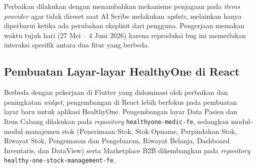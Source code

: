 \begin{enumerate}
          Perbaikan dilakukan dengan menambahkan mekanisme penjagaan pada \textit{items
              provider} agar tidak direset saat AI Scribe melakukan \textit{update},
          melainkan hanya diperbarui ketika ada perubahan eksplisit dari pengguna.
          Pengerjaan memakan waktu tujuh hari (27 Mei -- 4 Juni 2026) karena reproduksi
          bug ini memerlukan interaksi spesifik antara dua fitur yang berbeda.

\end{enumerate}

\subsection{Pembuatan Layar-layar HealthyOne di React}
Berbeda dengan pekerjaan di Flutter yang didominasi oleh perbaikan dan
peningkatan \textit{widget}, pengembangan di React lebih berfokus pada
pembuatan layar baru untuk aplikasi HealthyOne. Pengembangan layar Data Pasien
dan Item Cabang dilakukan pada \textit{repository}
\texttt{healthyone-medic-fe}, sedangkan modul-modul manajemen stok (Penerimaan
Stok, Stok Opname, Perpindahan Stok, Riwayat Stok, Pengemasan dan Pengeluaran,
Riwayat Belanja, Dashboard Inventaris, dan DataView) serta Marketplace B2B
dikembangkan pada \textit{repository} \texttt{healthy-one-stock-management-fe}.

